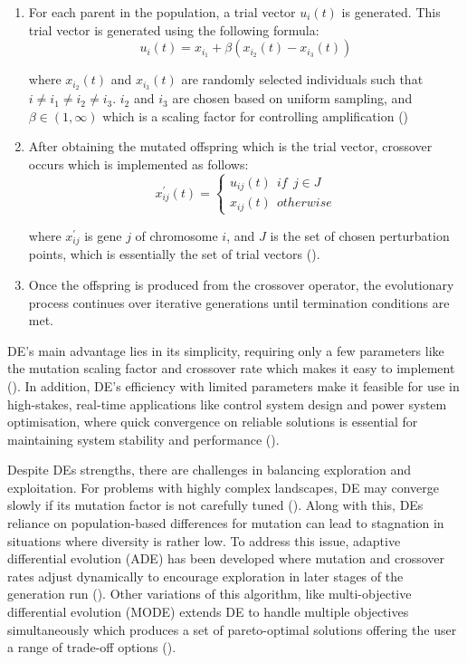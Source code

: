 \begin{enumerate}
	\item For each parent in the population, a trial vector $u_i(t)$ is generated. This trial vector is generated using the following formula:
	\begin{equation}
		u_i(t) = x_{i_1} + \beta(x_{i_2}(t) - x_{i_3}(t))
	\end{equation}

	where $x_{i_2}(t)$ and $x_{i_3}(t)$ are randomly selected individuals such that $i \neq i_1 \neq i_2 \neq i_3$. $i_2$ and  $i_3$ are chosen based on uniform sampling, and $\beta \in (1, \infty)$ which is a scaling factor for controlling amplification (\cite{storn1995differential})

	\item After obtaining the mutated offspring which is the trial vector, crossover occurs which is implemented as follows:
	\begin{equation}
		x_{ij}^{'}(t) =
		\begin{cases}
			u_{ij}(t) \:\: if \:\: j\in J \\ 
			x_{ij}(t) \:\: otherwise
		\end{cases}
	\end{equation}

	where $x_{ij}^{'}$ is gene $j$ of chromosome $i$, and $J$ is the set of chosen perturbation points, which is essentially the set of trial vectors (\cite{storn1995differential}).
	
	\item Once the offspring is produced from the crossover operator, the evolutionary process continues over iterative generations until termination conditions are met.
\end{enumerate}

\parbreak\noindent DE's main advantage lies in its simplicity, requiring only a few parameters like the mutation scaling factor and crossover rate which makes it easy to implement (\cite{storn1995differential}). In addition, DE's efficiency with limited parameters make it feasible for use in high-stakes, real-time applications like control system design and power system optimisation, where quick convergence on reliable solutions is essential for maintaining system stability and performance (\cite{das2010differential}).

\parbreak\noindent Despite DEs strengths, there are challenges in balancing exploration and exploitation. For problems with highly complex landscapes, DE may converge slowly if its mutation factor is not carefully tuned (\cite{das2010differential}). Along with this, DEs reliance on population-based differences for mutation can lead to stagnation in situations where diversity is rather low. To address this issue, adaptive differential evolution (ADE) has been developed where mutation and crossover rates adjust dynamically to encourage exploration in later stages of the generation run (\cite{das2010differential}). Other variations of this algorithm, like multi-objective differential evolution (MODE) extends DE to handle multiple objectives simultaneously which produces a set of pareto-optimal solutions offering the user a range of trade-off options (\cite{xue2003pareto}).

